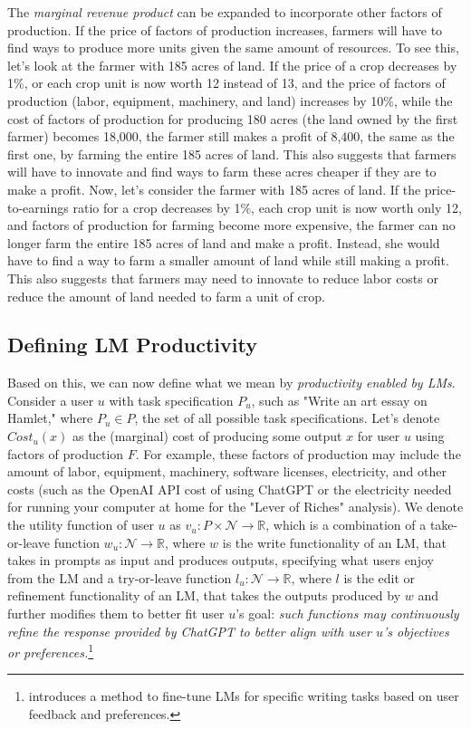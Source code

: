 \documentclass{article} %
\begin{document}
The \emph{marginal revenue product} can be expanded to incorporate other factors of production. 
If the price of factors of production increases, farmers will have to find ways to produce more units given the same amount of resources.
To see this, let's look at the farmer with 185 acres of land. 
If the price of a crop decreases by 1\%, or each crop unit is now worth 12 instead of 13, and the price of factors of production (labor, equipment, machinery, and land) increases by 10\%, while the cost of factors of production for producing 180 acres (the land owned by the first farmer) becomes 18,000, the farmer still makes a profit of 8,400, the same as the first one, by farming the entire 185 acres of land.
This also suggests that farmers will have to innovate and find ways to farm these acres cheaper if they are to make a profit.
Now, let's consider the farmer with 185 acres of land.
If the price-to-earnings ratio for a crop decreases by 1\%, each crop unit is now worth only 12, and factors of production for farming become more expensive, the farmer can no longer farm the entire 185 acres of land and make a profit.
Instead, she would have to find a way to farm a smaller amount of land while still making a profit.
This also suggests that farmers may need to innovate to reduce labor costs or reduce the amount of land needed to farm a unit of crop.

\subsection{Defining LM Productivity}

Based on this, we can now define what we mean by \emph{productivity enabled by LMs}.
Consider a user $u$ with task specification $P_u$, such as "Write an art essay on Hamlet," where $P_u \in P$, the set of all possible task specifications.
Let's denote $Cost_u(x)$ as the (marginal) cost of producing some output $x$ for user $u$ using factors of production $F$.
For example, these factors of production may include the amount of labor, equipment, machinery, software licenses, electricity, and other costs (such as the OpenAI API cost of using ChatGPT or the electricity needed for running your computer at home for the "Lever of Riches" analysis).
We denote the utility function of user $u$ as $v_u: P \times \mathcal{N} \to \mathbb{R}$, which is a combination of a take-or-leave function $w_u: \mathcal{N} \to \mathbb{R}$, where $w$ is the write functionality of an LM, that takes in prompts as input and produces outputs, specifying what users enjoy from the LM and a try-or-leave function $l_u: \mathcal{N} \to \mathbb{R}$, where $l$ is the edit or refinement functionality of an LM, that takes the outputs produced by $w$ and further modifies them to better fit user $u$'s goal:    \emph{such functions may continuously refine the response provided by ChatGPT to better align with user $u$'s objectives or preferences.}\footnote{\citet{salvi2024conversational} introduces a method to fine-tune LMs for specific writing tasks based on user feedback and preferences.}
\end{document}
